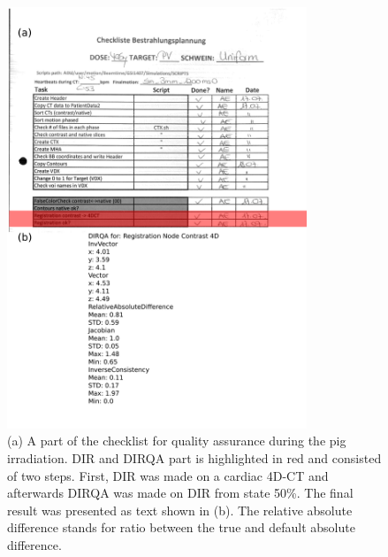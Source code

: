 \newpage
\begin{figure}[H]
	\begin{center}		
		\includegraphics[width=0.8\textwidth]{./Vmm/Images/checkList.png}
		\caption{(a) A part of the checklist for quality assurance during the pig irradiation. DIR and DIRQA part is highlighted in red and consisted of two steps. First, DIR was made on a cardiac 4D-CT and afterwards DIRQA was made on
		DIR from state 50\%. The final result was presented as text shown in (b). The relative absolute difference stands for ratio between the true and default absolute difference.}
		\label{checkList}
	\end{center}
\end{figure}
\newpage

